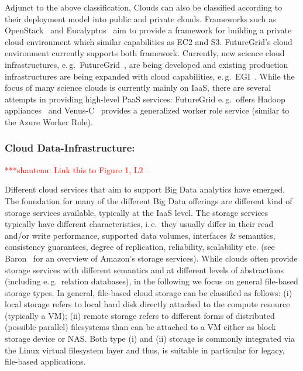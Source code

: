 \documentclass[times]{cpeauth}
\newcommand{\jhanote}[1]{ {\textcolor{red} { ***shantenu: #1 }}}
\newcommand{\alnote}[1]{ {\textcolor{green} { ***andreL: #1 }}}
\newcommand{\alnote}[1]{}
\newcommand{\jhanote}[1]{}
\begin{document}
% 



Adjunct to the above classification, Clouds can also be classified
according to their deployment model into public and private
clouds. Frameworks such as OpenStack~\cite{openstack} and
Eucalyptus~\cite{euca} aim to provide a framework for building a
private cloud environment which similar capabilities as EC2 and
S3. FutureGrid's cloud environment currently supports both
framework. Currently, new science cloud infrastructures, e.\,g.\
FutureGrid~\cite{futuregrid}, are being developed and existing
production infrastructures are being expanded with cloud capabilities,
e.\,g.\ EGI~\cite{egi-cloud}. While the focus of many science clouds
is currently mainly on IaaS, there are several attempts in providing
high-level PaaS services: FutureGrid e.\,g.\ offers Hadoop
appliances~\cite{2016793} and Venus-C~\cite{venusc-generic-worker}
provides a generalized worker role service (similar to the Azure
Worker Role).

\subsubsection*{Cloud Data-Infrastructure: }

\jhanote{Link this to Figure 1, L2}

Different cloud services that aim to support Big Data analytics have
emerged.  The foundation for many of the different Big Data offerings
are different kind of storage services available, typically at the
IaaS level. The storage services typically have different characteristics,
i.\,e.\ they usually differ in their read and/or write performance,
supported data volumes, interfaces \& semantics, consistency
guarantees, degree of replication, reliability, scalability etc.  
(see Baron~\cite{baron2010} for an overview of Amazon's storage
services). While clouds often provide storage services with different
semantics and at different levels of abstractions (including
e.\,g.\ relation databases), in the following we focus on general
file-based storage types. In general, file-based cloud storage can be
classified as follows: (i) local storage refers to local hard disk
directly attached to the compute resource (typically a VM); (ii)
remote storage refers to different forms of distributed (possible
parallel) filesystems than can be attached to a VM either as block
storage device or NAS. Both type (i) and (ii) storage is commonly
integrated via the Linux virtual filesystem layer and thus, is
suitable in particular for legacy, file-based applications.
\end{document}
